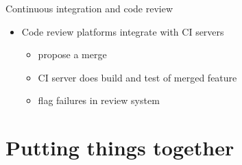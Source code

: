 \documentclass[presentation]{beamer}
\begin{document}
\begin{frame}[label=sec-3-4]{Continuous integration and code review}
\begin{itemize}
\item Code review platforms integrate with CI servers
\begin{itemize}
\item propose a merge
\item CI server does build and test of merged feature
\item flag failures in review system
\end{itemize}
\end{itemize}
\end{frame}
\section{Putting things together}
\label{sec-4}
\end{document}
